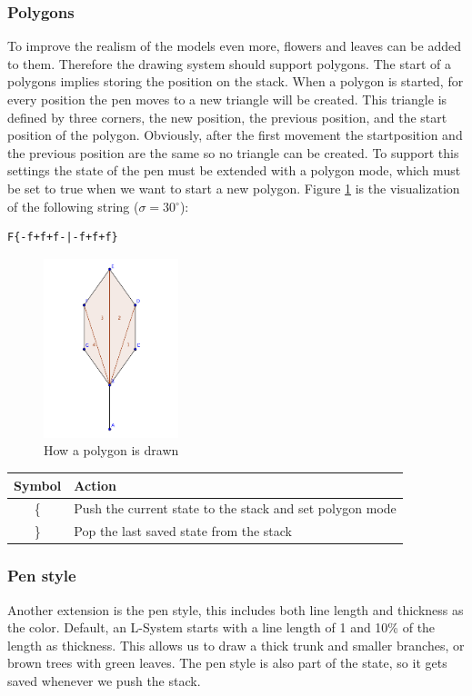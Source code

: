 \documentclass[11pt,a4paper]{article}
\newcommand{\degree}{\ensuremath{^\circ}}
\begin{document}
\subsubsection{Polygons}
To improve the realism of the models even more, flowers and leaves can be added to them. Therefore the drawing system should support polygons. The start of a polygons implies storing the position on the stack. When a polygon is started, for every position the pen moves to a new triangle will be created. This triangle is defined by three corners, the new position, the previous position, and the start position of the polygon. Obviously, after the first movement the startposition and the previous position are the same so no triangle can be created. To support this settings the state of the pen must be extended with a polygon mode, which must be set to true when we want to start a new polygon.
Figure \ref{fig:polygon} is the visualization of the following string ($\sigma = 30\degree$):
\begin{verbatim}
F{-f+f+f-|-f+f+f}
\end{verbatim}

\begin{figure}[h!]
  \centering
  \includegraphics[width=0.35\textwidth]{polygons.pdf}
  \caption{How a polygon is drawn}
  \label{fig:polygon}
\end{figure}

\begin{center}
\begin{tabular}{c | l}
Symbol & Action \\ \hline
\{ & Push the current state to the stack and set polygon mode \\
\} & Pop the last saved state from the stack \\
\end{tabular}
\end{center}

\subsubsection{Pen style}
Another extension is the pen style, this includes both line length and thickness as the color. Default, an L-System starts with a line length of 1 and 10\% of the length as thickness. This allows us to draw a thick trunk and smaller branches, or brown trees with green leaves. The pen style is also part of the state, so it gets saved whenever we push the stack.
\end{document}
